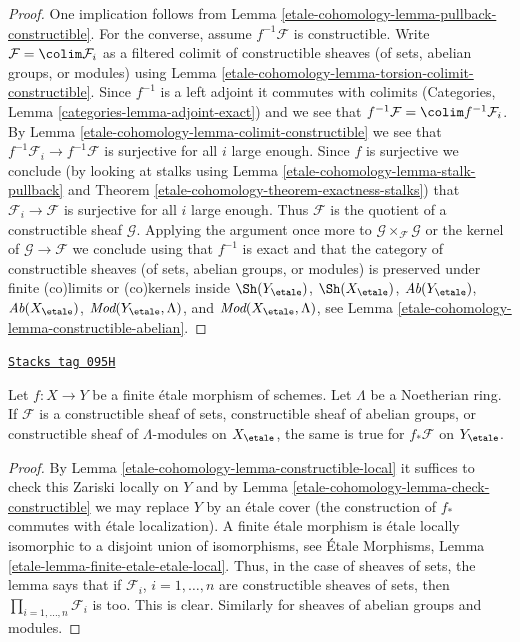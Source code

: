 \begin{proof}
One implication follows from Lemma \ref{etale-cohomology-lemma-pullback-constructible}.
For the converse, assume $f^{-1}\mathcal{F}$ is constructible.
Write $\mathcal{F} = \colim \mathcal{F}_i$ as a
filtered colimit of constructible sheaves (of sets, abelian groups, or modules)
using Lemma \ref{etale-cohomology-lemma-torsion-colimit-constructible}.
Since $f^{-1}$ is a left adjoint it commutes with colimits
(Categories, Lemma \ref{categories-lemma-adjoint-exact}) and we see that
$f^{-1}\mathcal{F} = \colim f^{-1}\mathcal{F}_i$.
By Lemma \ref{etale-cohomology-lemma-colimit-constructible} we see that
$f^{-1}\mathcal{F}_i \to f^{-1}\mathcal{F}$
is surjective for all $i$ large enough.
Since $f$ is surjective we conclude (by looking at stalks using
Lemma \ref{etale-cohomology-lemma-stalk-pullback} and
Theorem \ref{etale-cohomology-theorem-exactness-stalks})
that $\mathcal{F}_i \to \mathcal{F}$ is surjective for all $i$ large enough.
Thus $\mathcal{F}$ is the quotient of a constructible sheaf $\mathcal{G}$.
Applying the argument once more to
$\mathcal{G} \times_\mathcal{F} \mathcal{G}$ or
the kernel of $\mathcal{G} \to \mathcal{F}$
we conclude using that $f^{-1}$ is exact and that the category of
constructible sheaves (of sets, abelian groups, or modules) is
preserved under finite (co)limits or (co)kernels inside
$\Sh(Y_\etale)$, $\Sh(X_\etale)$, $\textit{Ab}(Y_\etale)$,
$\textit{Ab}(X_\etale)$, $\textit{Mod}(Y_\etale, \Lambda)$, and
$\textit{Mod}(X_\etale, \Lambda)$, see
Lemma \ref{etale-cohomology-lemma-constructible-abelian}.
\end{proof}

\begin{lemma}
\label{etale-cohomology-lemma-pushforward-constructible}
\href{https://stacks.math.columbia.edu/tag/095H}{\texttt{Stacks tag 095H}}

Let $f : X \to Y$ be a finite \'etale morphism of schemes. Let $\Lambda$ be a
Noetherian ring. If $\mathcal{F}$ is a constructible sheaf of sets,
constructible sheaf of abelian groups, or constructible sheaf of
$\Lambda$-modules on $X_\etale$, the same is true for
$f_*\mathcal{F}$ on $Y_\etale$.
\end{lemma}

\begin{proof}
By Lemma \ref{etale-cohomology-lemma-constructible-local} it suffices to check this
Zariski locally on $Y$ and by Lemma \ref{etale-cohomology-lemma-check-constructible}
we may replace $Y$ by an \'etale cover (the construction of $f_*$
commutes with \'etale localization). A finite \'etale morphism is
\'etale locally isomorphic to a disjoint union of isomorphisms, see
\'Etale Morphisms, Lemma \ref{etale-lemma-finite-etale-etale-local}.
Thus, in the case of sheaves of sets, the lemma says that if
$\mathcal{F}_i$, $i = 1, \ldots, n$ are constructible sheaves of sets, then
$\prod_{i = 1, \ldots, n} \mathcal{F}_i$ is too.
This is clear. Similarly for sheaves of abelian groups and modules.
\end{proof}

